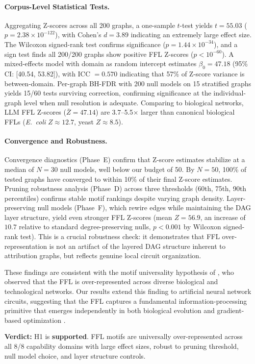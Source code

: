 \paragraph{Corpus-Level Statistical Tests.}
Aggregating Z-scores across all 200 graphs, a one-sample $t$-test yields $t = 55.03$ ($p = 2.38 \times 10^{-122}$), with Cohen's $d = 3.89$ indicating an extremely large effect size. The Wilcoxon signed-rank test confirms significance ($p = 1.44 \times 10^{-34}$), and a sign test finds all 200/200 graphs show positive FFL Z-scores ($p < 10^{-60}$). A mixed-effects model with domain as random intercept estimates $\beta_0 = 47.18$ (95\% CI: [40.54, 53.82]), with ICC $= 0.570$ indicating that 57\% of Z-score variance is between-domain. Per-graph BH-FDR with 200 null models on 15 stratified graphs yields 15/60 tests surviving correction, confirming significance at the individual-graph level when null resolution is adequate. Comparing to biological networks, LLM FFL Z-scores ($\bar{Z} = 47.14$) are 3.7--5.5$\times$ larger than canonical biological FFLs (\emph{E.~coli} $Z \approx 12.7$, yeast $Z \approx 8.5$).
\paragraph{Convergence and Robustness.}
Convergence diagnostics (Phase~E) confirm that Z-score estimates stabilize at a median of $N=30$ null models, well below our budget of 50. By $N=50$, 100\% of tested graphs have converged to within 10\% of their final Z-score estimates. Pruning robustness analysis (Phase~D) across three thresholds (60th, 75th, 90th percentiles) confirms stable motif rankings despite varying graph density. Layer-preserving null models (Phase~F), which rewire edges while maintaining the DAG layer structure, yield even stronger FFL Z-scores (mean $Z=56.9$, an increase of $10.7$ relative to standard degree-preserving nulls, $p<0.001$ by Wilcoxon signed-rank test). This is a crucial robustness check: it demonstrates that FFL over-representation is not an artifact of the layered DAG structure inherent to attribution graphs, but reflects genuine local circuit organization.

These findings are consistent with the motif universality hypothesis of \citet{milo2002network}, who observed that the FFL is over-represented across diverse biological and technological networks. Our results extend this finding to artificial neural network circuits, suggesting that the FFL captures a fundamental information-processing primitive that emerges independently in both biological evolution and gradient-based optimization \cite{alon2007network, milo2004superfamilies}.

\textbf{Verdict:} H1 is \textbf{supported}. FFL motifs are universally over-represented across all 8/8 capability domains with large effect sizes, robust to pruning threshold, null model choice, and layer structure controls.